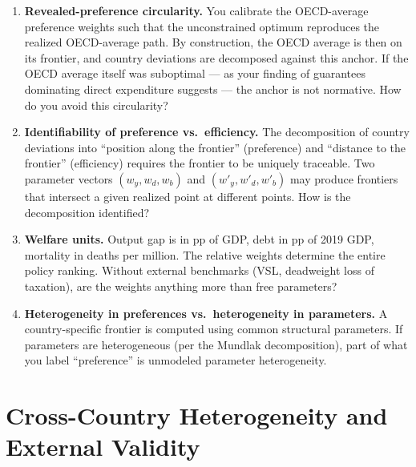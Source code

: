 \documentclass[11pt,a4paper]{article}
\begin{document}
\begin{enumerate}
\item \textbf{Revealed-preference circularity.} You calibrate the OECD-average preference weights such that the unconstrained optimum reproduces the realized OECD-average path. By construction, the OECD average is then on its frontier, and country deviations are decomposed against this anchor. If the OECD average itself was suboptimal --- as your finding of guarantees dominating direct expenditure suggests --- the anchor is not normative. How do you avoid this circularity?

\item \textbf{Identifiability of preference vs.\ efficiency.} The decomposition of country deviations into ``position along the frontier'' (preference) and ``distance to the frontier'' (efficiency) requires the frontier to be uniquely traceable. Two parameter vectors $(w_y, w_d, w_b)$ and $(w'_y, w'_d, w'_b)$ may produce frontiers that intersect a given realized point at different points. How is the decomposition identified?

\item \textbf{Welfare units.} Output gap is in pp of GDP, debt in pp of 2019 GDP, mortality in deaths per million. The relative weights determine the entire policy ranking. Without external benchmarks (VSL, deadweight loss of taxation), are the weights anything more than free parameters?

\item \textbf{Heterogeneity in preferences vs.\ heterogeneity in parameters.} A country-specific frontier is computed using common structural parameters. If parameters are heterogeneous (per the Mundlak decomposition), part of what you label ``preference'' is unmodeled parameter heterogeneity.
\end{enumerate}

\section{Cross-Country Heterogeneity and External Validity}
\end{document}
